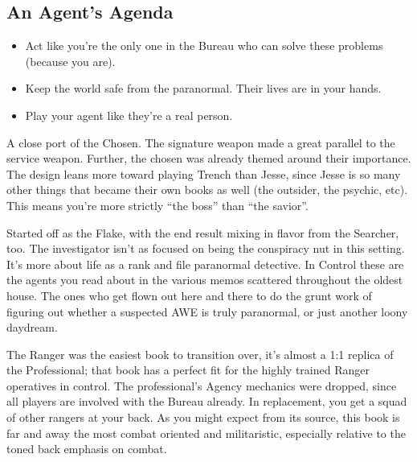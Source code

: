 \documentclass[10pt,oneside,landscape]{memoir}
\begin{document}
\begin{multicols}{3}

\begin{tcolorbox}[bottom=4mm,after skip=8mm]
\section*{An Agent's Agenda}
\begin{itemize}

\item Act like you’re the only one in the Bureau who can solve these problems (because you are).
\item Keep the world safe from the paranormal.  Their lives are in your hands.
\item Play your agent like they’re a real person.

\end{itemize}
\end{tcolorbox}

{A close port of the Chosen.  The signature weapon made a great parallel to the service weapon.  Further, the chosen was already themed around their importance.  The design leans more toward playing Trench than Jesse, since Jesse is so many other things that became their own books as well (the outsider, the psychic, etc).  This means you’re more strictly “the boss” than “the savior”.}

{Started off as the Flake, with the end result mixing in flavor from the Searcher, too.  The investigator isn’t as focused on being the conspiracy nut in this setting.  It’s more about life as a rank and file paranormal detective.  In Control these are the agents you read about in the various memos scattered throughout the oldest house.  The ones who get flown out here and there to do the grunt work of figuring out whether a suspected AWE is truly paranormal, or just another loony daydream.}

{The Ranger was the easiest book to transition over, it’s almost a 1:1 replica of the Professional; that book has a perfect fit for the highly trained Ranger operatives in control.  The professional’s Agency mechanics were dropped, since all players are involved with the Bureau already.  In replacement, you get a squad of other rangers at your back.  As you might expect from its source, this book is far and away the most combat oriented and militaristic, especially relative to the toned back emphasis on combat.}


\end{multicols}
\end{document}
